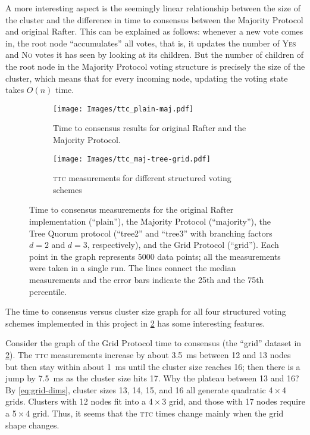 \documentclass[12pt,chapterprefix=true,toc=bibliography,numbers=noendperiod,
               footnotes=multiple,twoside]{scrreprt}
\newcommand{\yes}{{\fontfamily{jkposn}\selectfont\textsc{Yes}}}
\newcommand{\no}{{\fontfamily{jkposn}\selectfont\textsc{No}}}
\begin{document}
A more interesting aspect is the seemingly linear relationship between the size of the cluster and the difference in time to consensus between the Majority Protocol and original Rafter. This can be explained as follows: whenever a new vote comes in, the root node \enquote{accumulates} all votes, that is, it updates the number of \yes{} and \no{} votes it has seen by looking at its children. But the number of children of the root node in the Majority Protocol voting structure is precisely the size of the cluster, which means that for every incoming node, updating the voting state takes \(O(n)\) time.


\begin{figure}[p]
    \begin{subfigure}{1\textwidth}
        \centering
        \texttt{[image: Images/ttc\_plain-maj.pdf]}
        \caption{Time to consensus results for original Rafter and the Majority Protocol.}
        \label{fig:plain-maj-ttc}
    \end{subfigure}

    \begin{subfigure}{1\textwidth}
        \centering
        \texttt{[image: Images/ttc\_maj-tree-grid.pdf]}
        \caption{\textsc{ttc} measurements for different structured voting schemes}
        \label{fig:maj-tree-grid-ttc}
    \end{subfigure}
    \caption{Time to consensus measurements for the original Rafter implementation (\enquote{plain}), the Majority Protocol (\enquote{majority}), the Tree Quorum protocol (\enquote{tree2} and \enquote{tree3} with branching factors \(d = 2\) and \(d = 3\), respectively), and the Grid Protocol (\enquote{grid}). Each point in the graph represents 5000 data points; all the measurements were taken in a single run. The lines connect the median measurements and the error bars indicate the 25th and the 75th percentile.}
    \label{fig:ttc}
\end{figure}

The time to consensus versus cluster size graph for all four structured voting schemes implemented in this project in \cref{fig:maj-tree-grid-ttc} has some interesting features.

Consider the graph of the Grid Protocol time to consensus (the \enquote{grid} dataset in \cref{fig:maj-tree-grid-ttc}). The \textsc{ttc} measurements increase by about \SI{3.5}{\milli\second} between 12 and 13 nodes but then stay within about \SI{1}{\milli\second} until the cluster size reaches 16; then there is a jump by \SI{7.5}{\milli\second} as the cluster size hits 17. Why the plateau between 13 and 16? By \cref{eq:grid-dims}, cluster sizes 13, 14, 15, and 16 all generate quadratic 4\,\(\times\)\,4 grids. Clusters with 12 nodes fit into a 4\,\(\times\)\,3 grid, and those with 17 nodes require a 5\,\(\times\)\,4 grid. Thus, it seems that the \textsc{ttc} times change mainly when the grid shape changes.
\end{document}
